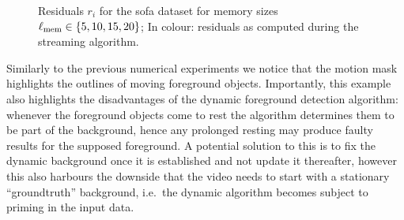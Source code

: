 \begin{figure}[!ht]
    \centering
    \caption{Residuals $r_i$ for the sofa dataset for memory sizes $\ell_\text{mem} \in \left\{5, 10, 15, 20\right\}$; In colour: residuals as computed during the streaming algorithm.}\label{fig:sofa-exp-residual}
\end{figure}

Similarly to the previous numerical experiments we notice that the motion mask highlights the outlines of moving foreground objects. Importantly, this example also highlights the disadvantages of the dynamic foreground detection algorithm: whenever the foreground objects come to rest the algorithm determines them to be part of the background, hence any prolonged resting may produce faulty results for the supposed foreground. A potential solution to this is to fix the dynamic background once it is established and not update it thereafter, however this also harbours the downside that the video needs to start with a stationary ``groundtruth'' background, i.e.\ the dynamic algorithm becomes subject to priming in the input data.


